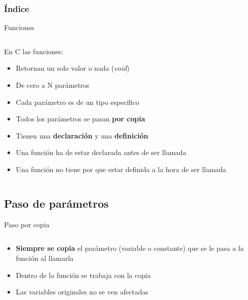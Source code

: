 \documentclass{mybeamer}
\institute{
	{\textsl{\large Tema 5}}
	\\[1em]
	\textbf{\Large C modular}
}
\begin{document}
\begin{frame}
\titlepage
\end{frame}

\begin{frame}
\frametitle{Índice}
\begin{multicols}{2}
	\tableofcontents
\end{multicols}
\end{frame}

\begin{framesec}{Funciones}
	\begin{columns}[onlytextwidth]
	\begin{column}{0.6\textwidth}
		En C las funciones:
		\begin{itemize}
			\item Retornan un solo valor o nada (\textit{void})
			\item De cero a N parámetros
			\item Cada parámetro es de un tipo específico
			\item Todos los parámetros se pasan \textbf{por copia}
			\item Tienen una \textbf{declaración} y una
				\textbf{definición}
			\item Una función ha de estar declarada antes de ser
				llamada
			\item Una función no tiene por que estar definida a la
				hora de ser llamada
		\end{itemize}
	\end{column}

	\begin{column}{0.4\textwidth}
		
	\end{column}
	\end{columns}
\end{framesec}

\subsection[Parámetros]{Paso de parámetros}
\begin{framesubsubsec}{Paso por copia}
	\begin{columns}[onlytextwidth]
	\begin{column}{0.5\textwidth}
		\begin{itemize}
			\item \textbf{Siempre se copia} el parámetro (variable o
				constante) que se le pasa a la función al
				llamarla
			\item Dentro de la función se trabaja con la copia
			\item Las variables originales no se ven afectadas
		\end{itemize}
	\end{column}

	\begin{column}{0.4\textwidth}
		
	\end{column}
	\end{columns}
\end{framesubsubsec}
\end{document}
